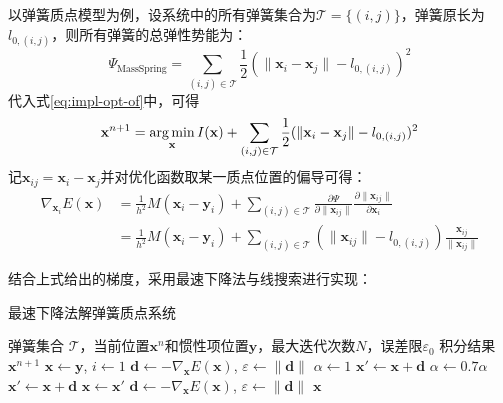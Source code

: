 以弹簧质点模型为例，设系统中的所有弹簧集合为$\mathcal T = \{ (i, j) \}$，弹簧原长为$l_{0,(i,j)}$，则所有弹簧的总弹性势能为：
\begin{equation}
  \Psi_{\mathrm{MassSpring}} = \sum_{(i, j) \in \mathcal T} \frac{1}{2}(\| \mathbf x_i - \mathbf x_j\| - l_{0, (i, j)})^2
\end{equation}
代入式\ref{eq:impl-opt-of}中，可得
\begin{equation}\label{eq:mass-spring-opt-problem}
  \mathbf x^{n+1} = \mathop{\arg\min}\limits_{\mathbf x} I(\mathbf x) + \sum_{(i, j) \in \mathcal T} \frac{1}{2}(\| \mathbf x_i - \mathbf x_j\| - l_{0, (i, j)})^2
\end{equation}
记$\mathbf x_{ij} = \mathbf x_i - \mathbf x_j$并对优化函数取某一质点位置的偏导可得：
\begin{equation}\label{eq:mass-spring-gradient}
  \begin{aligned}
    \nabla_{\mathbf x_i} E(\mathbf x) &= \frac{1}{h^2}M (\mathbf x_i - \mathbf y_i) +\sum_{(i, j) \in \mathcal T} \frac{\partial \Psi}{\partial \|\mathbf x_{ij} \|} \frac{\partial \|\mathbf x_{ij} \|}{\partial \mathbf x_i} \\
    &=\frac{1}{h^2} M (\mathbf x_i - \mathbf y_i) + \sum_{(i, j) \in \mathcal T} (\| \mathbf x_{ij} \| - l_{0, (i, j)})\frac{\mathbf x_{ij} }{\|\mathbf x_{ij} \|}
  \end{aligned}
\end{equation}

结合上式给出的梯度，采用最速下降法与线搜索进行实现：
\begin{algorithm}
  \caption{最速下降法解弹簧质点系统}
  \begin{algorithmic}[1]
    \Require 弹簧集合 $\mathcal T$，当前位置$\mathbf x^{n}$和惯性项位置$\mathbf y$，最大迭代次数$N$，误差限$\varepsilon_0$
    \Ensure 积分结果 $\mathbf x^{n+1}$
    \State $\mathbf x\leftarrow \mathbf y$, $i \leftarrow 1$
    \State $\mathbf d \leftarrow - \nabla_{\mathbf x}E(\mathbf x)$, $\varepsilon \leftarrow \|\mathbf d\|$
      \State $\alpha\leftarrow 1$
      \State $\mathbf x'\leftarrow \mathbf x + \mathbf d$
        \State $\alpha \leftarrow 0.7 \alpha$
        \State $\mathbf x' \leftarrow \mathbf x + \mathbf d$
      \EndWhile
      \State $\mathbf x \leftarrow \mathbf x'$
      \State $\mathbf d \leftarrow - \nabla_{\mathbf x}E(\mathbf x)$, $\varepsilon \leftarrow \|\mathbf d\|$
    \EndWhile
    \State \Return $\mathbf x$
  \end{algorithmic}
\end{algorithm}


